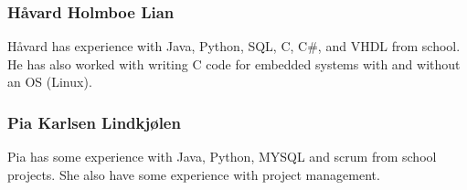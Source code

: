 \subsubsection{Håvard	Holmboe	Lian}
Håvard has experience with Java, Python, SQL, C, C\#, and VHDL from school. He has also worked with writing C code for embedded systems with and without an OS (Linux). 

\subsubsection{Pia	Karlsen	Lindkjølen}
Pia has some experience with Java, Python, MYSQL and scrum from school projects. She also have some experience with project management. 
